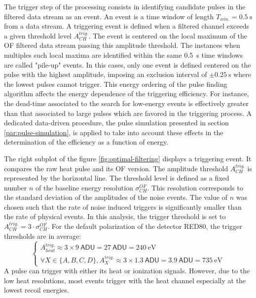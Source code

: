 The trigger step of the processing consists in identifying candidate pulses in the filtered data stream as an event. An event is a time window of length $T_{win.} = \SI{0.5}{\s}$ from a data stream. A triggering event is defined when a filtered channel exceeds a given threshold level $A_{CH}^{trig.}$. The event is centered on the local maximum of the OF filtered data stream passing this amplitude threshold. The instances when multiples such local maxima are identified within the same \SI{0.5}{\s} time windows are called "pile-up" events. In this cases, only one event is defined centered on the pulse with the highest amplitude, imposing an exclusion interval of $\pm\SI{0.25}{\s}$ where the lowest pulses cannot trigger.
This energy ordering of the pulse finding algorithm affects the energy dependence of the triggering efficiency. For instance, the dead-time associated to the search
for low-energy events is effectively greater than that associated to large pulses which are favored in the triggering process. A dedicated data-driven procedure, the pulse simulation presented in section \ref{par:pulse-simulation}, is applied to take into account these effects in the determination of the efficiency as a function of energy. 

The right subplot of the figure \ref{fig:optimal-filtering} displays a triggering event. It compares the raw heat pulse and its OF version. The amplitude threshold $A_{CH}^{trig.}$ is represented by the horizontal line. The threshold level is defined as a fixed number $n$ of the baseline energy resolution $\sigma_{CH}^{OF}$. This resolution corresponds to the standard deviation of the amplitudes of the noise events.
The value of $n$ was chosen such that the rate of noise induced triggers is significantly smaller than the rate of physical events.
In this analysis, the trigger threshold is set to $A_{CH}^{trig.} = 3 \cdot \sigma_{CH}^{OF}$. For the default polarization of the detector RED80, the trigger thresholds are in average:
\begin{equation}
\begin{cases}
A_{heat}^{trig.} \approx 3 \times \SI{9}{\textsf{ADU}} = \SI{27}{\textsf{ADU}} = \SI{240}{\eV} \\
\forall X \in \{A,B,C,D \}, 
A_{X}^{trig.} \approx 3 \times \SI{1.3}{\textsf{ADU}} = \SI{3.9}{\textsf{ADU}} = \SI{735}{\eV}
\end{cases}
\end{equation}
A pulse can trigger with either its heat or ionization signals. However, due to the low heat resolutions, most events trigger with the heat channel especially at the lowest recoil energies.




